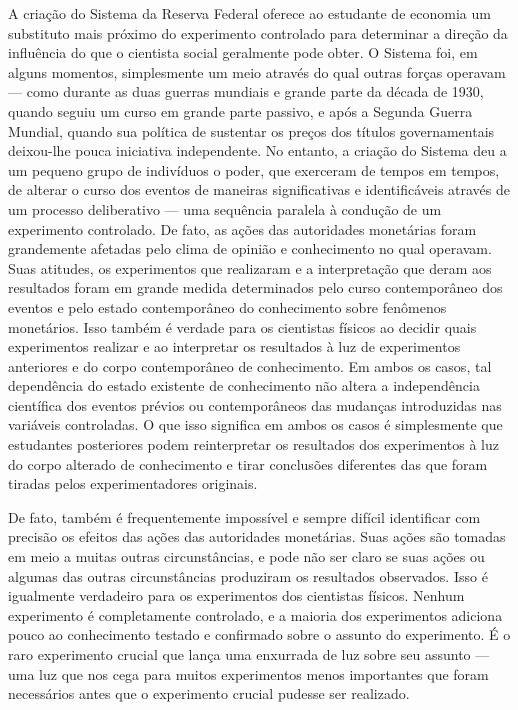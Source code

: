 \documentclass[a4paper,12pt]{article}[abntex2]
\begin{document}
A criação do Sistema da Reserva Federal oferece ao estudante de economia um substituto mais próximo do experimento controlado para determinar a direção da influência do que o cientista social geralmente pode obter. O Sistema foi, em alguns momentos, simplesmente um meio através do qual outras forças operavam — como durante as duas guerras mundiais e grande parte da década de 1930, quando seguiu um curso em grande parte passivo, e após a Segunda Guerra Mundial, quando sua política de sustentar os preços dos títulos governamentais deixou-lhe pouca iniciativa independente. No entanto, a criação do Sistema deu a um pequeno grupo de indivíduos o poder, que exerceram de tempos em tempos, de alterar o curso dos eventos de maneiras significativas e identificáveis através de um processo deliberativo — uma sequência paralela à condução de um experimento controlado. De fato, as ações das autoridades monetárias foram grandemente afetadas pelo clima de opinião e conhecimento no qual operavam. Suas atitudes, os experimentos que realizaram e a interpretação que deram aos resultados foram em grande medida determinados pelo curso contemporâneo dos eventos e pelo estado contemporâneo do conhecimento sobre fenômenos monetários. Isso também é verdade para os cientistas físicos ao decidir quais experimentos realizar e ao interpretar os resultados à luz de experimentos anteriores e do corpo contemporâneo de conhecimento. Em ambos os casos, tal dependência do estado existente de conhecimento não altera a independência científica dos eventos prévios ou contemporâneos das mudanças introduzidas nas variáveis controladas. O que isso significa em ambos os casos é simplesmente que estudantes posteriores podem reinterpretar os resultados dos experimentos à luz do corpo alterado de conhecimento e tirar conclusões diferentes das que foram tiradas pelos experimentadores originais.

De fato, também é frequentemente impossível e sempre difícil identificar com precisão os efeitos das ações das autoridades monetárias. Suas ações são tomadas em meio a muitas outras circunstâncias, e pode não ser claro se suas ações ou algumas das outras circunstâncias produziram os resultados observados. Isso é igualmente verdadeiro para os experimentos dos cientistas físicos. Nenhum experimento é completamente controlado, e a maioria dos experimentos adiciona pouco ao conhecimento testado e confirmado sobre o assunto do experimento. É o raro experimento crucial que lança uma enxurrada de luz sobre seu assunto — uma luz que nos cega para muitos experimentos menos importantes que foram necessários antes que o experimento crucial pudesse ser realizado.
\end{document}
